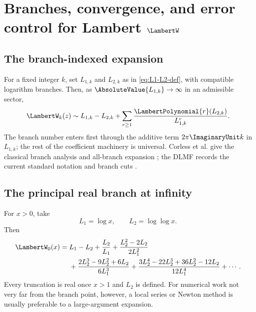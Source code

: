 \documentclass[11pt,oneside]{book}
\theoremstyle{definition}
\theoremstyle{remark}
\begin{document}
\chapter{Branches, convergence, and error control for Lambert \texorpdfstring{$\LambertW$}{W}}
\label{ch:lambert-branches}

\section{The branch-indexed expansion}
For a fixed integer $k$, set $L_{1,k}$ and $L_{2,k}$ as in
\eqref{eq:L1-L2-def}, with compatible logarithm branches.  Then, as
$\AbsoluteValue{L_{1,k}}\to\infty$ in an admissible sector,
\begin{equation}\label{eq:Wk-expansion}
 \LambertW_k(z)\sim L_{1,k}-L_{2,k}
 +\sum_{r\ge1}\frac{\LambertPolynomial{r}(L_{2,k})}{L_{1,k}^r}.
\end{equation}
The branch number enters first through the additive term
$2\pi\ImaginaryUnit k$ in
$L_{1,k}$; the rest of the coefficient machinery is universal.  Corless et
al. give the classical branch analysis and all-branch expansion
\cite{Corless1996}; the DLMF records the current standard notation and branch
cuts \cite{DLMF413}.

\section{The principal real branch at infinity}
For $x>0$, take
\[
 L_1=\log x,
 \qquad
 L_2=\log\log x.
\]
Then
\begin{align}\label{eq:W0-real-expansion}
 \LambertW_0(x)={}&L_1-L_2+\frac{L_2}{L_1}
 +\frac{L_2^2-2L_2}{2L_1^2}\\
 &+\frac{2L_2^3-9L_2^2+6L_2}{6L_1^3}
 +\frac{3L_2^4-22L_2^3+36L_2^2-12L_2}{12L_1^4}
 +\cdots.\notag
\end{align}
Every truncation is real once $x>1$ and $L_2$ is defined.  For numerical work
not very far from the branch point, however, a local series or Newton method
is usually preferable to a large-argument expansion.
\end{document}
